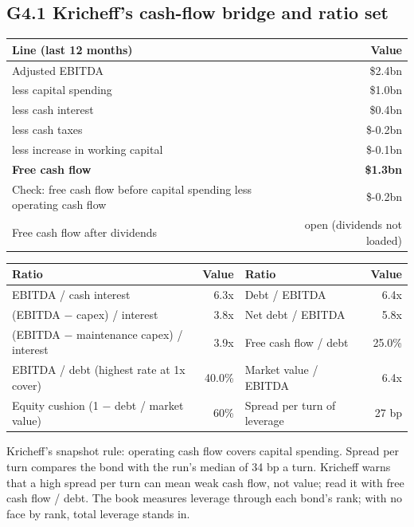 \documentclass[11pt,a4paper]{article}
\begin{document}
\subsection*{G4.1 Kricheff's cash-flow bridge and ratio set}
\begin{center}\footnotesize\setlength{\tabcolsep}{3.5pt}\begin{tabular}{@{}lr@{}}\toprule
Line (last 12 months) & Value \\\midrule
Adjusted EBITDA & \$2.4bn \\
less capital spending & \$1.0bn \\
less cash interest & \$0.4bn \\
less cash taxes & \$-0.2bn \\
less increase in working capital & \$-0.1bn \\
\textbf{Free cash flow} & \textbf{\$1.3bn} \\
Check: free cash flow before capital spending less operating cash flow & \$-0.2bn \\
Free cash flow after dividends & open (dividends not loaded) \\
\bottomrule\end{tabular}\end{center}
\begin{center}\footnotesize\setlength{\tabcolsep}{3.5pt}\begin{tabular}{@{}lrlr@{}}\toprule
Ratio & Value & Ratio & Value \\\midrule
EBITDA / cash interest & 6.3x & Debt / EBITDA & 6.4x \\
(EBITDA $-$ capex) / interest & 3.8x & Net debt / EBITDA & 5.8x \\
(EBITDA $-$ maintenance capex) / interest & 3.9x & Free cash flow / debt & 25.0\% \\
EBITDA / debt (highest rate at 1x cover) & 40.0\% & Market value / EBITDA & 6.4x \\
Equity cushion (1 $-$ debt / market value) & 60\% & Spread per turn of leverage & 27 bp \\
\bottomrule\end{tabular}\end{center}
Kricheff's snapshot rule: operating cash flow covers capital spending. Spread per turn compares the bond with the run's median of 34 bp a turn. Kricheff warns that a high spread per turn can mean weak cash flow, not value; read it with free cash flow / debt. The book measures leverage through each bond's rank; with no face by rank, total leverage stands in.
\end{document}
